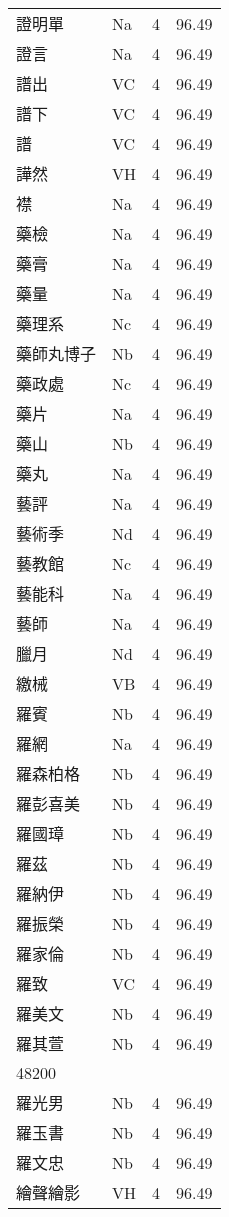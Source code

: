 \documentclass[twocolumn]{book}
\begin{document}
\begin{supertabular}{llrr}
證明單 & Na & 4 &  96.49\\
證言 & Na & 4 &  96.49\\
譜出 & VC & 4 &  96.49\\
譜下 & VC & 4 &  96.49\\
譜 & VC & 4 &  96.49\\
譁然 & VH & 4 &  96.49\\
襟 & Na & 4 &  96.49\\
藥檢 & Na & 4 &  96.49\\
藥膏 & Na & 4 &  96.49\\
藥量 & Na & 4 &  96.49\\
藥理系 & Nc & 4 &  96.49\\
藥師丸博子 & Nb & 4 &  96.49\\
藥政處 & Nc & 4 &  96.49\\
藥片 & Na & 4 &  96.49\\
藥山 & Nb & 4 &  96.49\\
藥丸 & Na & 4 &  96.49\\
藝評 & Na & 4 &  96.49\\
藝術季 & Nd & 4 &  96.49\\
藝教館 & Nc & 4 &  96.49\\
藝能科 & Na & 4 &  96.49\\
藝師 & Na & 4 &  96.49\\
臘月 & Nd & 4 &  96.49\\
繳械 & VB & 4 &  96.49\\
羅賓 & Nb & 4 &  96.49\\
羅網 & Na & 4 &  96.49\\
羅森柏格 & Nb & 4 &  96.49\\
羅彭喜美 & Nb & 4 &  96.49\\
羅國璋 & Nb & 4 &  96.49\\
羅茲 & Nb & 4 &  96.49\\
羅納伊 & Nb & 4 &  96.49\\
羅振榮 & Nb & 4 &  96.49\\
羅家倫 & Nb & 4 &  96.49\\
羅致 & VC & 4 &  96.49\\
羅美文 & Nb & 4 &  96.49\\
羅其萱 & Nb & 4 &  96.49\\
48200\\
羅光男 & Nb & 4 &  96.49\\
羅玉書 & Nb & 4 &  96.49\\
羅文忠 & Nb & 4 &  96.49\\
繪聲繪影 & VH & 4 &  96.49\\

\end{supertabular}
\end{document}
